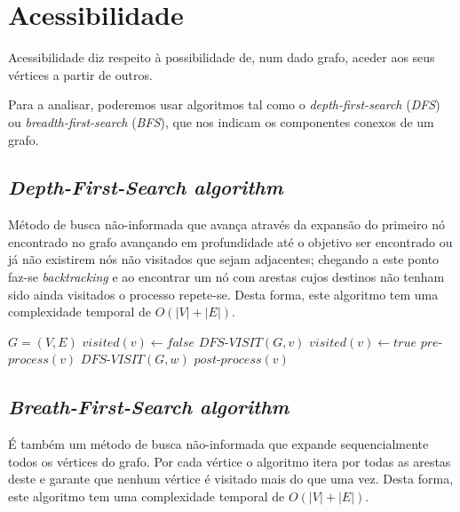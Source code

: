 \documentclass[12pt,a4paper]{report}
\begin{document}
	\section{Acessibilidade}
	Acessibilidade diz respeito à possibilidade de, num dado grafo, aceder aos seus vértices a partir de outros. \par
	Para a analisar, poderemos usar algoritmos tal como o \textit{depth-first-search} (\textit{DFS}) ou \textit{breadth-first-search} (\textit{BFS}), que nos indicam os componentes conexos de um grafo.

		\subsection{\textit{Depth-First-Search algorithm}}
		Método de busca não-informada que avança através da expansão do primeiro nó encontrado no grafo avançando em profundidade até o objetivo ser encontrado ou já não existirem nós não visitados que sejam adjacentes; chegando a este ponto faz-se \textit{backtracking} e ao encontrar um nó com arestas cujos destinos não tenham sido ainda visitados o processo repete-se. Desta forma, este algoritmo tem uma complexidade temporal de \( O(|V| + |E|) \).

		\begin{center}
			\begin{algorithmic}[1]
				\State $G = (V, E)$
				\newline
						\State $ visited(v) \leftarrow false $
					\EndFor
								\State $DFS$-$VISIT(G, v)$
						\EndIf
					\EndFor
				\EndFunction
				\newline
					\State $ visited(v) \leftarrow true $
					\State $ pre$-$process(v) $
							\State $DFS$-$VISIT(G, w)$
						\EndIf
					\EndFor
					\State $post$-$process(v)$
				\EndFunction
			\end{algorithmic}
		\end{center}

		\subsection{\textit{Breath-First-Search algorithm}}
		É também um método de busca não-informada que expande sequencialmente todos os vértices do grafo. Por cada vértice o algoritmo itera por todas as arestas deste e garante que nenhum vértice é visitado mais do que uma vez. Desta forma, este algoritmo tem uma complexidade temporal de \( O(|V| + |E|)\).
\end{document}
